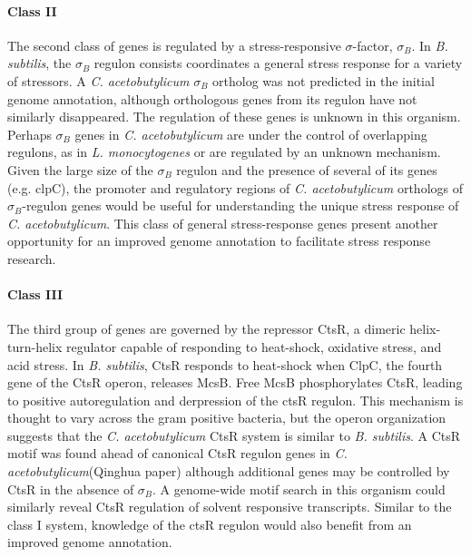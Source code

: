 \paragraph{Class II}
The second class of genes is regulated by a stress-responsive $\sigma$-factor, $\sigma_{B}$. In \textit{B. subtilis}, the $\sigma_B$ regulon consists coordinates a general stress response for a variety of stressors. A \textit{C. acetobutylicum} $\sigma_{B}$ ortholog was not predicted in the initial genome annotation,\cite{91,42} although orthologous genes from its regulon have not similarly disappeared.\cite{132,133,134,135} The regulation of these genes is unknown in this organism. Perhaps $\sigma_{B}$ genes in \textit{C. acetobutylicum} are under the control of overlapping regulons, as in \textit{L. monocytogenes}\cite{193} or are regulated by an unknown mechanism. Given the large size of the $\sigma_{B}$ regulon and the presence of several of its genes (e.g. clpC\cite{132}), the promoter and regulatory regions of \textit{C. acetobutylicum} orthologs of $\sigma_{B}$-regulon genes would be useful for understanding the unique stress response of \textit{C. acetobutylicum}. This class of general stress-response genes present another opportunity for an improved genome annotation to facilitate stress response research.

\paragraph{Class III}
The third group of genes are governed by the repressor CtsR, a dimeric helix-turn-helix regulator capable of responding to heat-shock, oxidative stress, and acid stress.\cite{136} In \textit{B. subtilis}, CtsR responds to heat-shock when ClpC, the fourth gene of the CtsR operon, releases McsB.\cite{140} Free McsB phosphorylates CtsR, leading to positive autoregulation and derpression of the ctsR regulon.\cite{137,138,140} This mechanism is thought to vary across the gram positive bacteria,\cite{137} but the operon organization suggests that the \textit{C. acetobutylicum} CtsR system is similar to \textit{B. subtilis}.\cite{42} A CtsR motif was found ahead of canonical CtsR regulon genes in \textit{C. acetobutylicum}(Qinghua paper) although additional genes may be controlled by CtsR in the absence of $\sigma_{B}$. A genome-wide motif search in this organism could similarly reveal CtsR regulation of solvent responsive transcripts. Similar to the class I system, knowledge of the ctsR regulon would also benefit from an improved genome annotation.

